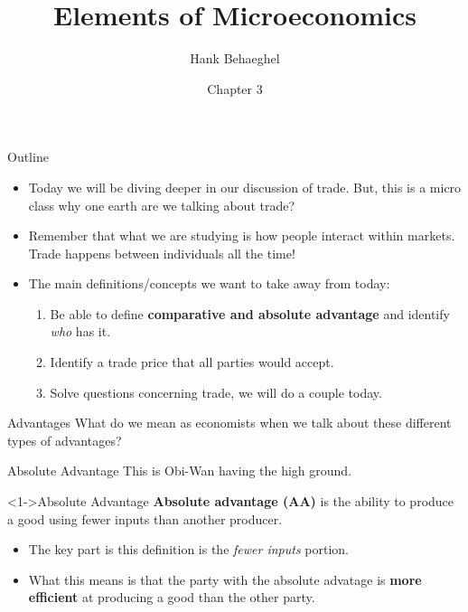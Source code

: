 \documentclass[aspectratio=169]{beamer}
\title{Elements of Microeconomics}
\author{Hank Behaeghel}
\institute{Johns Hopkins University}
\date{Chapter 3}
\begin{document}
\maketitle

\begin{frame}{Outline}
    \begin{itemize}
        \item Today we will be diving deeper in our discussion of trade.
        But, this is a micro class why one earth are we talking about trade?
        \item Remember that what we are studying is how people interact within markets. Trade happens between individuals all the time!
        \item The main definitions/concepts we want to take away from today:
        \begin{enumerate}
            \item Be able to define \textbf{comparative and absolute advantage} and identify \textit{who} has it.
            \item Identify a trade price that all parties would accept.
            \item Solve questions concerning trade, we will do a couple today.
        \end{enumerate}
    \end{itemize}
\end{frame}

\begin{frame}{Advantages}
    What do we mean as economists when we talk about these different types of advantages?
    
\end{frame}


\begin{frame}{Absolute Advantage}
    This is Obi-Wan having the high ground.
   \begin{block} <1->{Absolute Advantage}
        \textbf{Absolute advantage (AA)} is the ability to produce a good using fewer inputs than another producer.
    \end{block}
    
    \begin{itemize}
        \item<2-> The key part is this definition is the \textit{fewer inputs} portion.
        \item<3-> What this means is that the party with the absolute advatage is \textbf{more efficient} at producing a good than the other party.
    \end{itemize}
\end{frame}
\end{document}
